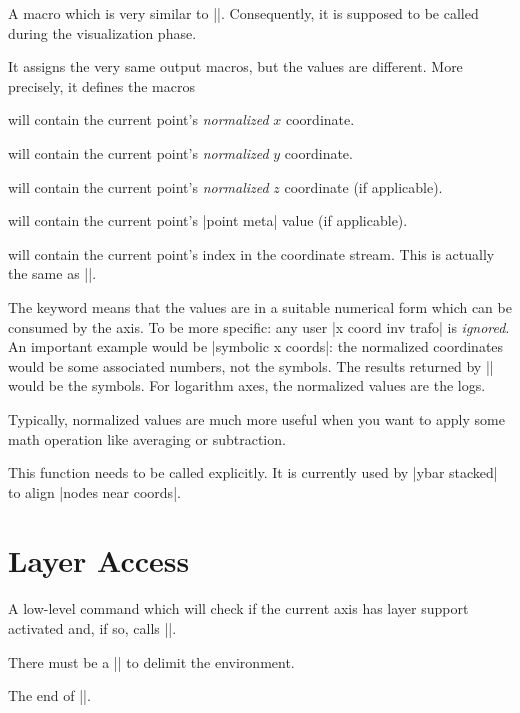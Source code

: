 \begin{command}{\pgfplotspointgetnormalizedcoordinates}
	A macro which is very similar to |\pgfplotspointgetcoordinates|.
	Consequently, it is supposed to be called during the visualization phase. 

	It assigns the very same output macros, but the values are different. More precisely, it defines the macros

	 will contain the current point's \emph{normalized} $x$ coordinate. 

	 will contain the current point's \emph{normalized} $y$ coordinate. 

	 will contain the current point's \emph{normalized} $z$ coordinate (if applicable). 

	 will contain the current point's |point meta| value (if applicable). 

	 will contain the current point's index in the coordinate stream. This is actually the same as |\coordindex|.
	
	The keyword  means that the values are in a suitable numerical form which can be consumed by the axis. To be more specific: any user |x coord inv trafo| is \emph{ignored}. An important example would be |symbolic x coords|: the normalized coordinates would be some associated numbers, not the symbols. The results returned by |\pgfplotspointgetcoordinates| would be the symbols. For logarithm axes, the normalized values are the logs.

	Typically, normalized values are much more useful when you want to apply some math operation like averaging or subtraction.


	This function needs to be called explicitly. It is currently used by |ybar stacked| to align |nodes near coords|.
\end{command}

\section{Layer Access}
\begin{command}{\pgfplotsonlayer{}}
    A low-level command which will check if the current axis has layer support activated and, if so, calls |\pgfonlayer|.

    There must be a |\endpgfplotsonlayer| to delimit the environment.
\end{command}
\begin{command}{\endpgfplotsonlayer}
    The end of |\pgfplotsonlayer|.
\end{command}

